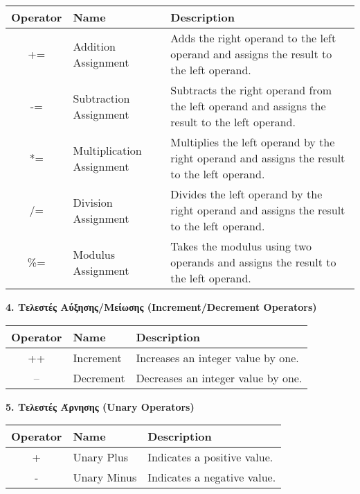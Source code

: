 \begin{table}[h!]
    \begin{tabular}{|c|l|p{5cm}|}
    \hline
     \textbf{Operator} & \textbf{Name} & \textbf{Description} \\ \hline
     += & Addition Assignment & Adds the right operand to the left operand and assigns the result to the left operand. \\ \hline
     -= & Subtraction Assignment & Subtracts the right operand from the left operand and assigns the result to the left operand. \\ \hline
     *= & Multiplication Assignment & Multiplies the left operand by the right operand and assigns the result to the left operand. \\ \hline
     /= & Division Assignment & Divides the left operand by the right operand and assigns the result to the left operand. \\ \hline
     \%= & Modulus Assignment & Takes the modulus using two operands and assigns the result to the left operand. \\ \hline
    \end{tabular}
    \label{table:operators}
\end{table}

\textbf{4. Τελεστές Αύξησης/Μείωσης (Increment/Decrement Operators)}

\begin{table}[h!]
    \begin{tabular}{|c|l|p{8cm}|}
    \hline
     \textbf{Operator} & \textbf{Name} & \textbf{Description} \\ \hline
     ++ & Increment & Increases an integer value by one. \\ \hline
     -- & Decrement & Decreases an integer value by one. \\ \hline
    \end{tabular}
    \label{table:operators}
\end{table}

\newpage

\textbf{5. Τελεστές Άρνησης (Unary Operators)}

\begin{table}[h!]
    \begin{tabular}{|c|l|p{8cm}|}
    \hline
     \textbf{Operator} & \textbf{Name} & \textbf{Description} \\ \hline
     + & Unary Plus & Indicates a positive value. \\ \hline
     - & Unary Minus & Indicates a negative value. \\ \hline
    \end{tabular}
    \label{table:operators}
\end{table}

